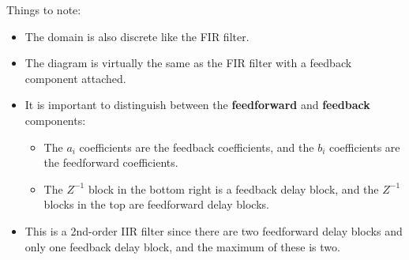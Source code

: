 \begin{center}
\end{center}

Things to note:

\begin{itemize}
    \item The domain is also discrete like the FIR filter.
    \item The diagram is virtually the same as the FIR filter with a feedback component attached.
    \item It is important to distinguish between the \textbf{feedforward} and \textbf{feedback} components:
          \begin{itemize}
              \item The $a_i$ coefficients are the feedback coefficients, and the $b_i$ coefficients are the feedforward coefficients.
              \item The $Z^{-1}$ block in the bottom right is a feedback delay block, and the $Z^{-1}$ blocks in the top are feedforward delay blocks.
          \end{itemize}
    \item This is a 2nd-order IIR filter since there are two feedforward delay blocks and only one feedback delay block, and the maximum of these is two.
\end{itemize}